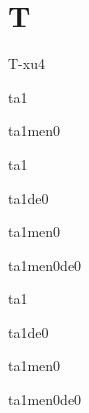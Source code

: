 \section*{T}
\begin{multicols*}{2}

\begin{verbete}[T-恤]{T-xu4}
\end{verbete}

\begin{verbete}[它]{ta1}
\end{verbete}

\begin{verbete}[它们]{ta1men0}
\end{verbete}

\begin{verbete}[他]{ta1}
\end{verbete}

\begin{verbete}[他的]{ta1de0}
\end{verbete}

\begin{verbete}[他们]{ta1men0}
\end{verbete}

\begin{verbete}[他们的]{ta1men0de0}
\end{verbete}

\begin{verbete}[她]{ta1}
\end{verbete}

\begin{verbete}[她的]{ta1de0}
\end{verbete}

\begin{verbete}[她们]{ta1men0}
\end{verbete}

\begin{verbete}[她们的]{ta1men0de0}
\end{verbete}


\end{multicols*}
